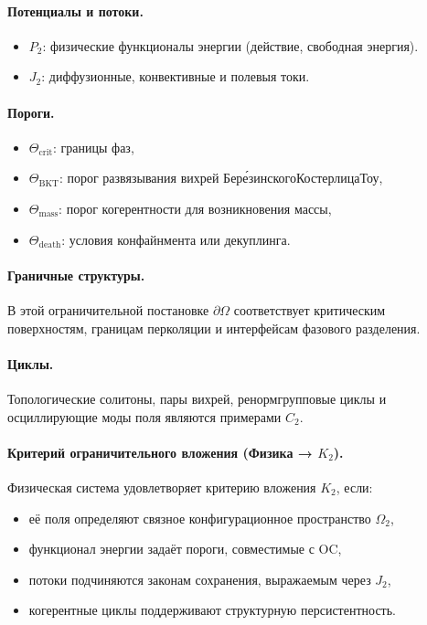 \paragraph{Потенциалы и потоки.}
\begin{itemize}
  \item \(P_2\): физические функционалы энергии (действие, свободная энергия).
  \item \(J_2\): диффузионные, конвективные и полевыя токи.
\end{itemize}

\paragraph{Пороги.}
\begin{itemize}
  \item \(\Theta_{\mathrm{crit}}\): границы фаз,
  \item \(\Theta_{\mathrm{BKT}}\): порог развязывания вихрей
        Бере́зинского\textendash\mbox{Костерлица\textendash}Тоу,
  \item \(\Theta_{\mathrm{mass}}\): порог когерентности для возникновения массы,
  \item \(\Theta_{\mathrm{death}}\): условия конфайнмента или декуплинга.
\end{itemize}

\paragraph{Граничные структуры.}
В этой ограничительной постановке \(\partial\Omega\) соответствует критическим
поверхностям, границам перколяции и интерфейсам фазового разделения.

\paragraph{Циклы.}
Топологические солитоны, пары вихрей, ренормгрупповые циклы и
осциллирующие моды поля являются примерами \(C_2\).

\paragraph{Критерий ограничительного вложения (Физика → \texorpdfstring{$K_2$}{K2}).}
Физическая система удовлетворяет критерию вложения \(K_2\), если:
\begin{itemize}
  \item её поля определяют связное конфигурационное пространство \(\Omega_2\),
  \item функционал энергии задаёт пороги, совместимые с OC,
  \item потоки подчиняются законам сохранения, выражаемым через \(J_2\),
  \item когерентные циклы поддерживают структурную персистентность.
\end{itemize}


